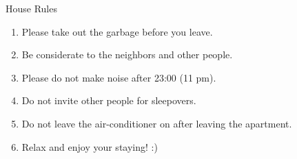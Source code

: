 \documentclass[12pt]{article}
\begin{document}
\begin{center}
\Huge
House Rules
\end{center}
\uwave{\hspace{15cm}}
\vspace{1cm}

\begin{enumerate}
\Large
\item Please take out the garbage before you leave.
\item Be considerate to the neighbors and other people.
\item Please do not make noise after 23:00 (11 pm).
\item Do not invite other people for sleepovers.
\item Do not leave the air-conditioner on after leaving the apartment.
\item Relax and enjoy your staying! :)
\end{enumerate}
\end{document}
